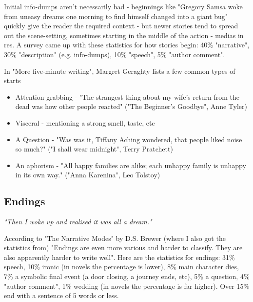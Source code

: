\documentclass[11pt]{article}
\begin{document}
Initial info-dumps aren't necessarily bad - beginnings like "Gregory Samsa woke from uneasy dreams one morning to find himself changed into a giant bug" quickly give the reader the required context - but newer stories tend to spread out the scene-setting, sometimes starting in the middle of the action - medias in res. A survey came up with these statistics for how stories begin: 40\% "narrative", 30\% "description" (e.g. info-dumps), 10\% "speech", 5\% "author comment".




In "More five-minute writing", Margret Geraghty lists a few common types of starts


\begin{itemize}
\item Attention-grabbing - "The strangest thing about my wife's return from the dead was how other people reacted" ("The Beginner's Goodbye", Anne Tyler)

\item Visceral - mentioning a strong smell, taste, etc

\item A Question - "Was was it, Tiffany Aching wondered, that people liked noise so much?" ("I shall wear midnight", Terry Pratchett)

\item An aphorism - "All happy families are alike; each unhappy family is unhappy in its own way." ("Anna Karenina", Leo Tolstoy)
\end{itemize}

\subsection*{Endings}
\textit{"Then I woke up and realised it was all a dream."}



According to "The Narrative Modes" by D.S. Brewer (where I also got the statistics from) "Endings are even more various and harder to classify. They are also apparently harder to write well". Here are the statistics for endings: 31\% speech, 10\% ironic (in novels the percentage is lower), 8\% main character dies, 7\% a symbolic final event (a door closing, a journey ends, etc), 5\% a question, 4\% "author comment", 1\% wedding (in novels the percentage is far higher). Over 15\% end with a sentence of 5 words or less.
\end{document}
